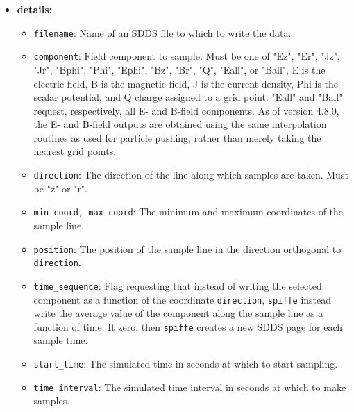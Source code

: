 \begin{itemize}
\item {\bf details:} 
\begin{itemize}
    \item {\tt filename}: Name of an SDDS file to which to write the data.
    \item {\tt component}: Field component to sample.  Must be one of
        "Ez", "Er", "Jz", "Jr", "Bphi", "Phi", "Ephi", "Bz", "Br", "Q",
        "Eall", or "Ball",
        E is the electric field, B is the magnetic field,
        J is the current density, Phi is the scalar potential, and Q
        charge assigned to a grid point.
        "Eall" and "Ball" request, respectively, all E- and B-field components.
        As of version 4.8.0, the E- and B-field outputs are obtained using
        the same interpolation routines as used for particle pushing, rather
        than merely taking the nearest grid points.
    \item {\tt direction}: The direction of the line along which samples are
        taken.  Must be "z" or "r".
    \item {\tt min\_coord, max\_coord}: The minimum and maximum coordinates
        of the sample line.
    \item {\tt position}: The position of the sample line in the direction
        orthogonal to {\tt direction}.
    \item {\tt time\_sequence}:  Flag requesting that instead of writing
        the selected component as a function of the coordinate {\tt direction},
        {\tt spiffe} instead write the average value of the component along
        the sample line as a function of time.  It zero, then {\tt spiffe}
        creates a new SDDS page for each sample time.
    \item {\tt start\_time}: The simulated time in seconds at which to start
        sampling.
    \item {\tt time\_interval}: The simulated time interval in seconds at which
        to make samples.
\end{itemize}

\end{itemize}

